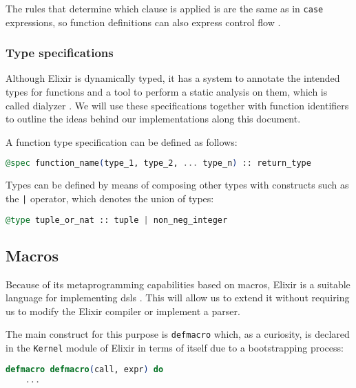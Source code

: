 The rules that determine which clause is applied is are the same as in
\verb|case| expressions, so function definitions can also express control flow
\citep{programmingElixir}.

\subsubsection{Type specifications}
\label{prelim:typespecs}

Although Elixir is dynamically typed, it has a system to annotate the intended
types for functions and a tool to perform a static analysis on them, which is 
called \gls{dialyzer} \citep{Dialyzer}. We will use these specifications
together with function identifiers to outline the ideas behind our
implementations along this document.

A function type specification can be defined as follows: 

\begin{lstlisting}[language=elixir,numbers=none,frame=none]
@spec function_name(type_1, type_2, ... type_n) :: return_type
\end{lstlisting}

Types can be defined by means of composing other types with constructs such as
the \verb+|+ operator, which denotes the union of types:

\begin{lstlisting}[language=elixir,numbers=none,frame=none]
@type tuple_or_nat :: tuple | non_neg_integer
\end{lstlisting}

\subsection{Macros}

Because of its metaprogramming capabilities based on macros, Elixir is a
suitable language for implementing \gls{dsl}s \citep{metaprogrammingElixir}.
This will allow us to extend it without requiring us to modify the Elixir
compiler or implement a parser.

The main construct for this purpose is \verb|defmacro| which, as a curiosity, is
declared in the \verb|Kernel| module of Elixir in terms of itself due to a
bootstrapping process:

\begin{lstlisting}[language=elixir,numbers=none,frame=none]
  defmacro defmacro(call, expr) do
    ...
\end{lstlisting}


